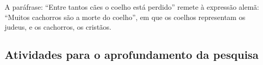 \documentclass[12pt]{extarticle}
\begin{document}
A paráfrase: ``Entre tantos cães o coelho está perdido'' remete à
expressão alemã: ``Muitos cachorros são a morte do coelho'', em que os
coelhos representam os judeus, e os cachorros, os cristãos.

\subsection{Atividades para o aprofundamento da pesquisa}

\begin{comment}
No Ensino Médio, da mesma forma que no Ensino Fundamental, a \textsc{bncc}
organiza o trabalho com as práticas de linguagem em cinco \textbf{campos
de atuação social}. São eles: campo da vida pessoal, campo da vida
pública, campo jornalístico"-midiático, campo artístico"-literário e campo
das práticas de estudo e pesquisa.

De acordo com essa divisão, propomos na sequência um trabalho
interdiscursivo e intertextual com a obra \emph{O Rabi de Bacherach}

\begin{quote}
O campo da vida pessoal pretende funcionar como espaço de articulações
e sínteses das aprendizagens de outros campos postas a serviço dos
projetos de vida dos estudantes. As práticas de linguagem privilegiadas
nesse campo relacionam"-se com a ampliação do saber sobre si, tendo em
vista as condições que cercam a vida contemporânea e as condições
juvenis no Brasil e no mundo.

Está em questão também possibilitar vivências significativas de práticas
colaborativas em situações de interação presenciais ou em ambientes
digitais e aprender, na articulação com outras áreas, campos e com os
projetos e escolhas pessoais dos jovens, procedimentos de levantamento,
tratamento e divulgação de dados e informações e o uso desses dados em
produções diversas e na proposição de ações e projetos de natureza
variada, para fomentar o protagonismo juvenil de forma
contextualizada. (\textsc{bncc}, p. 494)
\end{quote}
\end{comment}
\end{document}
